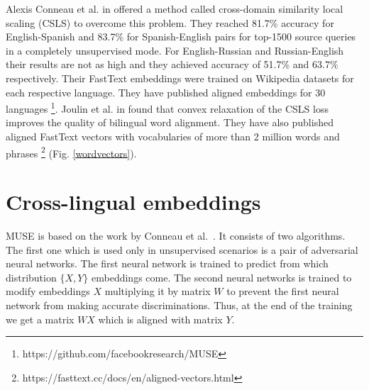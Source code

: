 \documentclass[11pt,a4paper]{article}
\begin{document}
Alexis Conneau et al. in \citeyear{muse} offered a method called cross-domain similarity local scaling (CSLS) to overcome this problem. They reached 81.7\% accuracy for English-Spanish and 83.7\% for Spanish-English pairs for top-1500 source queries in a completely unsupervised mode. For English-Russian and Russian-English their results are not as high and they achieved accuracy of 51.7\% and 63.7\% respectively. Their FastText embeddings were trained on Wikipedia datasets for each respective language. They have published aligned embeddings for 30 languages \footnote{https://github.com/facebookresearch/MUSE}. Joulin et al. in \citeyear{joulin2018loss} found that convex relaxation of the CSLS loss improves the quality of bilingual word alignment. They have also published aligned FastText vectors with vocabularies of more than 2 million words and phrases \footnote{https://fasttext.cc/docs/en/aligned-vectors.html} (Fig. \ref*{wordvectors}).

\section{Cross-lingual embeddings}

MUSE is based on the work by Conneau et al.~\cite{muse}. It consists of two algorithms. The first one which is used only in unsupervised scenarios is a pair of adversarial neural networks. The first neural network is trained to predict from which distribution $\{X, Y\}$ embeddings come. The second neural networks is trained to modify embeddings $X$ multiplying it by matrix $W$ to prevent the first neural network from making accurate discriminations. Thus, at the end of the training we get a matrix $WX$ which is aligned with matrix $Y$.
\end{document}
